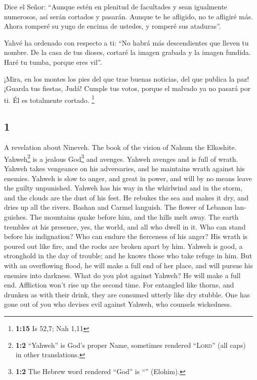 \begin{paracol}{2}
 Dice el Señor: ``Aunque estén en plenitud de facultades
y sean igualmente numerosos, así serán cortados y pasarán. Aunque te he
afligido, no te afligiré más.  Ahora romperé su yugo de
encima de ustedes, y romperé sus ataduras''.

 Yahvé ha ordenado con respecto a ti: ``No habrá más
descendientes que lleven tu nombre. De la casa de tus dioses, cortaré la
imagen grabada y la imagen fundida. Haré tu tumba, porque eres vil''.

 ¡Mira, en los montes los pies del que trae buenas
noticias, del que publica la paz! ¡Guarda tus fiestas, Judá! Cumple tus
votos, porque el malvado ya no pasará por ti. Él es totalmente cortado.
\footnote{\textbf{1:15} Is 52,7; Nah 1,11}

\switchcolumn
\begin{otherlanguage}{english}

\hypertarget{section-1}{%
\section{1}\label{section-1}}

 A revelation about Nineveh. The book of the vision of
Nahum the Elkoshite.  Yahweh\footnote{\textbf{1:2}
  ``Yahweh'' is God's proper Name, sometimes rendered ``\textsc{Lord}''
  (all caps) in other translations.} is a jealous God\footnote{\textbf{1:2}
  The Hebrew word rendered ``God'' is ``'' (Elohim).} and
avenges. Yahweh avenges and is full of wrath. Yahweh takes vengeance on
his adversaries, and he maintains wrath against his enemies.
 Yahweh is slow to anger, and great in power, and will by
no means leave the guilty unpunished. Yahweh has his way in the
whirlwind and in the storm, and the clouds are the dust of his feet.
 He rebukes the sea and makes it dry, and dries up all the
rivers. Bashan and Carmel languish. The flower of Lebanon languishes.
 The mountains quake before him, and the hills melt away.
The earth trembles at his presence, yes, the world, and all who dwell in
it.  Who can stand before his indignation? Who can endure
the fierceness of his anger? His wrath is poured out like fire, and the
rocks are broken apart by him.  Yahweh is good, a
stronghold in the day of trouble; and he knows those who take refuge in
him.  But with an overflowing flood, he will make a full
end of her place, and will pursue his enemies into darkness.
 What do you plot against Yahweh? He will make a full end.
Affliction won't rise up the second time.  For entangled
like thorns, and drunken as with their drink, they are consumed utterly
like dry stubble.  One has gone out of you who devises
evil against Yahweh, who counsels wickedness.


\end{otherlanguage}
\end{paracol}
